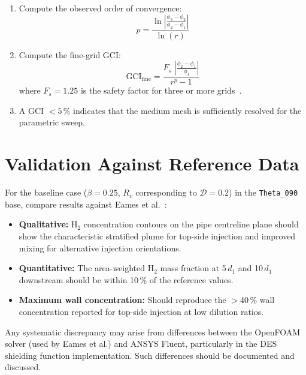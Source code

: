 \documentclass[12pt,a4paper]{report}
\begin{document}
\begin{enumerate}
  \item Compute the observed order of convergence:
  \begin{equation}
    p = \frac{\ln\!\left|\frac{\phi_3 - \phi_2}{\phi_2 - \phi_1}\right|}
             {\ln(r)}
    \label{eq:orderp}
  \end{equation}

  \item Compute the fine-grid GCI:
  \begin{equation}
    \text{GCI}_{\text{fine}} =
    \frac{F_s\;\left|\frac{\phi_2 - \phi_1}{\phi_1}\right|}{r^p - 1}
    \label{eq:GCI}
  \end{equation}
  where $F_s = 1.25$ is the safety factor for three or more
  grids~\cite{Roache1994}.

  \item A GCI $< 5$\,\% indicates that the medium mesh is
        sufficiently resolved for the parametric sweep.
\end{enumerate}


\section{Validation Against Reference Data}

For the baseline case ($\beta = 0.25$, $R_v$ corresponding to
$\mathcal{D} = 0.2$) in the \texttt{Theta\_090} base, compare results
against Eames et al.~\cite{Eames2022}:

\begin{itemize}
  \item \textbf{Qualitative:} H$_2$ concentration contours on the
        pipe centreline plane should show the characteristic
        stratified plume for top-side injection and improved mixing
        for alternative injection orientations.
  \item \textbf{Quantitative:} The area-weighted H$_2$ mass fraction
        at 5\,$d_1$ and 10\,$d_1$ downstream should be within 10\,\%
        of the reference values.
  \item \textbf{Maximum wall concentration:} Should reproduce the
        $>$40\,\% wall concentration reported for top-side injection
        at low dilution ratios.
\end{itemize}

\noindent Any systematic discrepancy may arise from differences between
the OpenFOAM solver (used by Eames et al.) and ANSYS Fluent, particularly
in the DES shielding function implementation.  Such differences should
be documented and discussed.
\end{document}
